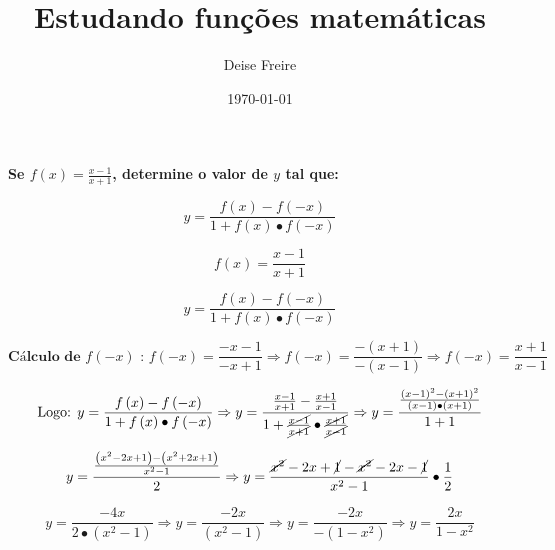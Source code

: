 \documentclass{article} %
\begin{document}

\title{Estudando funções matemáticas} %

\author{Deise Freire} %

\date{\today} %

\maketitle %

\textbf{Se $f\left( x \right) = \frac{x - 1}{x + 1}$, determine o valor de $y$ tal que: } 

\[y = \frac{f\left( x \right) - f\left( -x \right)}{1 + f\left( x \right) \bullet f\left( -x \right)} \]

\begin{minipage}{.4\textwidth} %
\begin{equation}
f\left( x \right) = \frac{x - 1}{x + 1} 
\end{equation}
\end{minipage}
\hfill %
\begin{minipage}{.4\textwidth} %
\begin{equation}
 y = \frac{f\left( x \right) - f\left( -x \right)}{1 + f\left( x \right) \bullet f\left( -x \right)}   
\end{equation}
\end{minipage}

\[ 
\textbf{Cálculo de $f\left(-x \right)$ : } f\left(-x \right) = \frac{-x - 1}{-x + 1}  \Rightarrow f\left( -x\right) = \frac{- \left( x + 1 \right)}{-\left( x - 1 \right)} \Rightarrow f\left( -x\right) = \frac{ x + 1 }{ x - 1} 
\]

\[ \text{Logo: } y = \frac{f\left( x \right) - f\left( -x \right)}{1 + f\left( x \right) \bullet f\left( -x \right)} \Rightarrow y = \frac{ \frac{x - 1}{x + 1} - \frac{x + 1}{x - 1} }{1 + \frac { \cancel {x - 1} }{\cancel {x + 1} } \bullet \frac{\cancel{x + 1} }{\cancel{ x - 1 }} } \Rightarrow y = \frac{ \frac{\left( x - 1 \right)^{2} - \left( x + 1 \right)^{2} }{\left( x - 1\right) \bullet \left(x + 1 \right)}  }{1 + 1} \] 

\[y = \frac{ \frac{\left(x^{2} - 2x +1 \right) - \left( x^{2} + 2x + 1 \right)}{x^{2} - 1 } }{2} \Rightarrow y = \frac{ \cancel{x^{2}} - 2x + \cancel{1} - \cancel{x^{2} }- 2x - \cancel{1} }{x^{2} - 1} \bullet \frac{1}{2} \]


\[y = \frac{- 4x }{2 \bullet \left( x^{2} - 1 \right)} \Rightarrow y = \frac{-2x}{\left( x^{2} - 1 \right)} \Rightarrow y = \frac{- 2x}{- \left(1 - x^{2}\right)} \Rightarrow y = \frac{2x}{ 1 - x^{2}} \]
\end{document}
